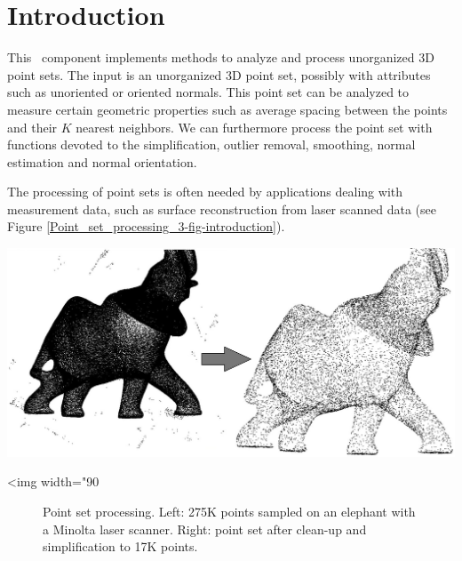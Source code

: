 \section{Introduction}

This \cgal\ component implements methods to analyze and process unorganized 3D point sets. The input is an unorganized 3D point set, possibly with attributes such as unoriented or oriented normals. This point set can be analyzed to measure certain geometric properties such as average spacing between the points and their $K$ nearest neighbors. We can furthermore process the point set with functions devoted to the simplification, outlier removal, smoothing, normal estimation and normal orientation. 


The processing of point sets is often needed by applications dealing with measurement data, such as surface reconstruction from laser scanned data (see Figure \ref{Point_set_processing_3-fig-introduction}).


\begin{center}
    \label{Point_set_processing_3-fig-introduction}
    \begin{ccTexOnly}
        \includegraphics[width=1.0\textwidth]{Point_set_processing_3/introduction} %
    \end{ccTexOnly}
    \begin{ccHtmlOnly}
        <img width="90%
    \end{ccHtmlOnly}
    \begin{figure}[h]
        \caption{Point set processing.
                 Left: 275K points sampled on an elephant with
                 a Minolta laser scanner.
                 Right: point set after clean-up and
                 simplification to 17K points.}
    \end{figure}
\end{center}

